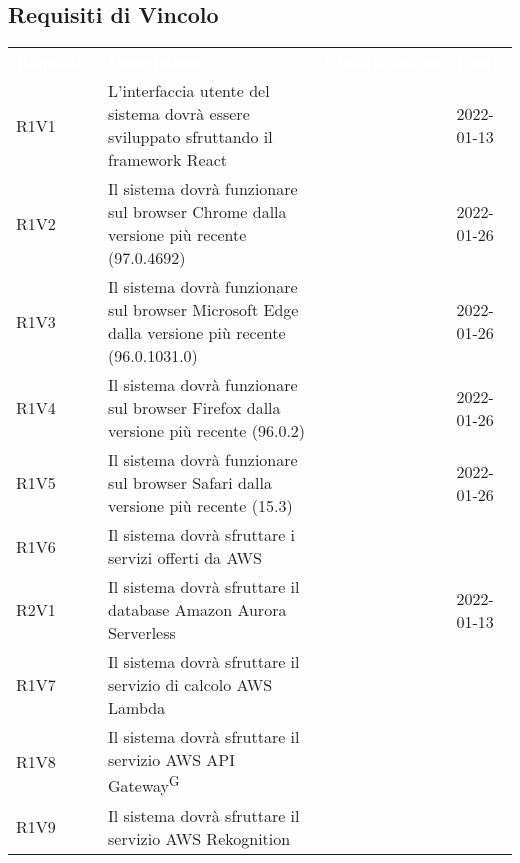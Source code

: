 \subsection{Requisiti di Vincolo}


\renewcommand{\arraystretch}{1.5}
\begin{longtable}{ m{}<{\centering}  m{}<{\centering}  m{}<{\centering}  m{}<{\centering}}
	\rowcolor{darkblue}
	\textcolor{white}{\textbf{Requisito}} &\textcolor{white}{\textbf{Descrizione}}& \textcolor{white}{\textbf{Classificazione}} & \textcolor{white}{\textbf{Fonti}}\\ 

	R1V1 & L’interfaccia utente del sistema dovrà essere sviluppato sfruttando il framework React & \Ob & \Vi{} 2022-01-13 \\	

	R1V2 & Il sistema dovrà funzionare sul browser Chrome dalla versione più recente (97.0.4692) & \Ob & \Ve{} 2022-01-26 \\	
	 
	R1V3 & Il sistema dovrà funzionare sul browser Microsoft Edge dalla versione più recente (96.0.1031.0) & \Ob & \Ve{} 2022-01-26 \\	

	R1V4 & Il sistema dovrà funzionare sul browser Firefox dalla versione più recente (96.0.2) & \Ob & \Ve{} 2022-01-26 \\	
	 
	R1V5 & Il sistema dovrà funzionare sul browser Safari dalla versione più recente (15.3) & \Ob & \Ve{} 2022-01-26 \\	
	 
	R1V6 & Il sistema dovrà sfruttare i servizi offerti da AWS & \Ob & \Ca \\	
	 
	R2V1 & Il sistema dovrà sfruttare il database Amazon Aurora Serverless & \De & \Vi{} 2022-01-13 \\
	
	R1V7 & Il sistema dovrà sfruttare il servizio di calcolo AWS Lambda & \Ob & \Ca \\	
	 
	R1V8 & Il sistema dovrà sfruttare il servizio AWS API Gateway\textsuperscript{G} & \Ob & \Ca \\
	
	R1V9 & Il sistema dovrà sfruttare il servizio AWS Rekognition & \Ob & \Ca \\
		

\end{longtable}

